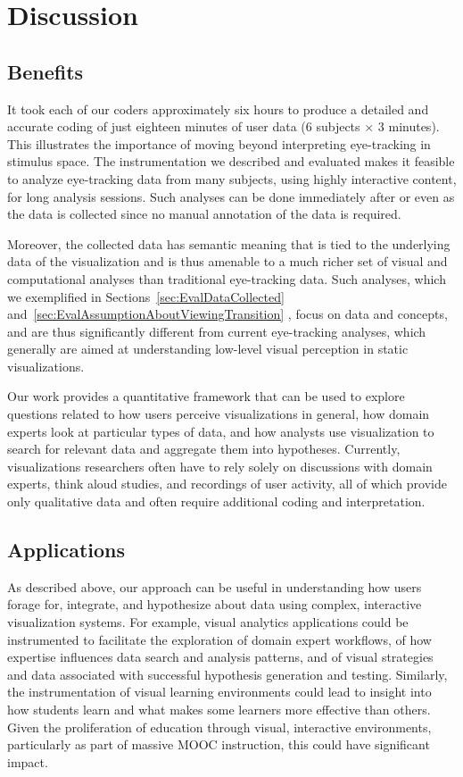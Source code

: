 ﻿\section{Discussion}
\label{sec:Discussion}
\subsection{Benefits}
\label{sec:Benefits}

It took each of our coders approximately six hours to produce a detailed and accurate coding of just eighteen minutes of user data ($6$ subjects $\times$ $3$ minutes). This illustrates the importance of moving beyond interpreting eye-tracking in stimulus space. The instrumentation we described and evaluated makes it feasible to analyze eye-tracking data from many subjects, using highly interactive content, for long analysis sessions. Such analyses can be done immediately after or even as the data is collected since no manual annotation of the data is required. 

Moreover, the collected data has semantic meaning that is tied to the underlying data of the visualization and is thus amenable to a much richer set of visual and computational analyses than traditional eye-tracking data. Such analyses, which we exemplified in Sections~\ref{sec:EvalDataCollected} and~\ref{sec:EvalAssumptionAboutViewingTransition} , focus on data and concepts, and are thus significantly different from current eye-tracking analyses, which generally are aimed at understanding low-level visual perception in static visualizations.

Our work provides a quantitative framework that can be used to explore questions related to how users perceive visualizations in general, how domain experts look at particular types of data, and how analysts use visualization to search for relevant data and aggregate them into hypotheses. Currently, visualizations researchers often have to rely solely on discussions with domain experts, think aloud studies, and recordings of user activity, all of which provide only qualitative data and often require additional coding and interpretation.


\subsection{Applications}
\label{sec:Applications}
As described above, our approach can be useful in understanding how users forage for, integrate, and hypothesize about data using complex, interactive visualization systems. For example, visual analytics applications could be instrumented to facilitate the exploration of domain expert workflows, of how expertise influences data search and analysis patterns, and of visual strategies and data associated with successful hypothesis generation and testing. Similarly, the instrumentation of visual learning environments could lead to insight into how students learn and what makes some learners more effective than others. Given the proliferation of education through visual, interactive environments, particularly as part of massive MOOC instruction, this could have significant impact. 

